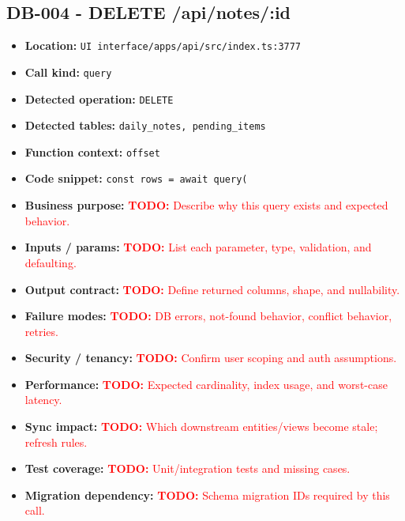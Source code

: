 \documentclass[11pt]{article}
\newcommand{\todoitem}[1]{\textcolor{red}{\textbf{TODO:} #1}}
\begin{document}
\subsection{DB-004 - DELETE /api/notes/:id}
\begin{itemize}[leftmargin=1.5em]
\item \textbf{Location:} \texttt{UI interface/apps/api/src/index.ts:3777}
\item \textbf{Call kind:} \texttt{query}
\item \textbf{Detected operation:} \texttt{DELETE}
\item \textbf{Detected tables:} \texttt{daily\_notes, pending\_items}
\item \textbf{Function context:} \texttt{offset}
\item \textbf{Code snippet:} \texttt{const rows = await query(}
\item \textbf{Business purpose:} \todoitem{Describe why this query exists and expected behavior.}
\item \textbf{Inputs / params:} \todoitem{List each parameter, type, validation, and defaulting.}
\item \textbf{Output contract:} \todoitem{Define returned columns, shape, and nullability.}
\item \textbf{Failure modes:} \todoitem{DB errors, not-found behavior, conflict behavior, retries.}
\item \textbf{Security / tenancy:} \todoitem{Confirm user scoping and auth assumptions.}
\item \textbf{Performance:} \todoitem{Expected cardinality, index usage, and worst-case latency.}
\item \textbf{Sync impact:} \todoitem{Which downstream entities/views become stale; refresh rules.}
\item \textbf{Test coverage:} \todoitem{Unit/integration tests and missing cases.}
\item \textbf{Migration dependency:} \todoitem{Schema migration IDs required by this call.}
\end{itemize}
\end{document}
